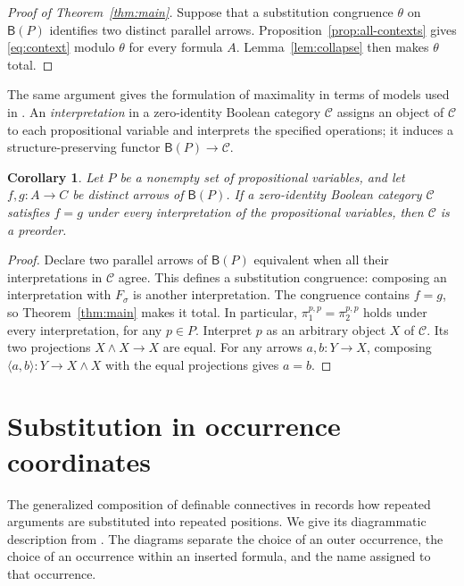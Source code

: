 \documentclass[11pt]{article}
\newtheorem{corollary}[theorem]{Corollary}
\newcommand{\B}{\mathsf B}
\begin{document}
\begin{proof}[Proof of Theorem~\ref{thm:main}]
Suppose that a substitution congruence $\theta$ on $\B(P)$ identifies
two distinct parallel arrows. Proposition~\ref{prop:all-contexts}
gives \eqref{eq:context} modulo $\theta$ for every formula $A$.
Lemma~\ref{lem:collapse} then makes $\theta$ total.
\end{proof}

The same argument gives the formulation of maximality in terms of
models used in \cite[\S9.3, p.~194]{DP}. An \emph{interpretation} in
a zero-identity Boolean category $\mathcal C$ assigns an object of
$\mathcal C$ to each propositional variable and interprets the
specified operations; it induces a structure-preserving functor
$\B(P)\to\mathcal C$.

\begin{corollary}\label{cor:models}
Let $P$ be a nonempty set of propositional variables, and let
$f,g:A\to C$ be distinct arrows of $\B(P)$.
If a zero-identity Boolean category $\mathcal C$ satisfies $f=g$
under every interpretation of the propositional variables, then
$\mathcal C$ is a preorder.
\end{corollary}

\begin{proof}
Declare two parallel arrows of $\B(P)$ equivalent when all their
interpretations in $\mathcal C$ agree. This defines a substitution
congruence: composing an interpretation with $F_\sigma$ is another
interpretation. The congruence contains $f=g$, so
Theorem~\ref{thm:main} makes it total. In particular,
$\pi_1^{p,p}=\pi_2^{p,p}$ holds under every interpretation, for any
$p\in P$. Interpret $p$ as an arbitrary object $X$ of $\mathcal C$.
Its two projections $X\wedge X\to X$ are equal. For any arrows $a,b:Y\to X$, composing
$\langle a,b\rangle:Y\to X\wedge X$ with the equal projections gives $a=b$.
\end{proof}

\appendix
\section{Substitution in occurrence coordinates}\label{app:substitution}

The generalized composition of definable connectives in
\cite[\S2.5, pp.~45--46]{DP} records how repeated arguments are
substituted into repeated positions. We give its diagrammatic description
from \cite[\S\S9.2--9.3]{Notation}. The diagrams separate the choice of
an outer occurrence, the choice of an occurrence within an inserted
formula, and the name assigned to that occurrence.
\end{document}
